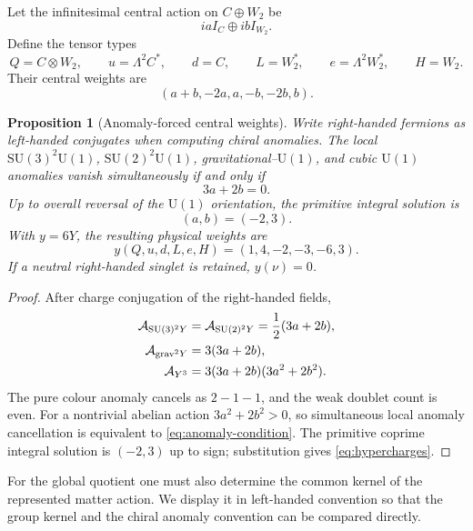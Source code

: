 \documentclass[11pt]{article}
\numberwithin{equation}{section}
\newtheorem{proposition}[theorem]{Proposition}
\theoremstyle{definition}
\theoremstyle{remark}
\newcommand{\U}{\mathrm U}
\newcommand{\SU}{\mathrm{SU}}
\begin{document}
Let the infinitesimal central action on $C\oplus W_2$ be
\[
iaI_C\oplus ibI_{W_2}.
\]
Define the tensor types
\begin{equation}
Q=C\otimes W_2,\qquad
u=\Lambda^2C^*,\qquad
d=C,\qquad
L=W_2^*,\qquad
e=\Lambda^2W_2^*,\qquad
H=W_2.
\label{eq:SM-types}
\end{equation}
Their central weights are
\begin{equation}
(a+b,-2a,a,-b,-2b,b).
\label{eq:central-weights}
\end{equation}

\begin{proposition}[Anomaly-forced central weights]
\label{thm:hypercharge}
Write right-handed fermions as left-handed conjugates when computing chiral
anomalies.  The local
$\SU(3)^2\U(1)$,
$\SU(2)^2\U(1)$,
gravitational--$\U(1)$,
and cubic $\U(1)$ anomalies vanish simultaneously if and only if
\begin{equation}
3a+2b=0.
\label{eq:anomaly-condition}
\end{equation}
Up to overall reversal of the $\U(1)$ orientation, the primitive integral
solution is
\[
(a,b)=(-2,3).
\]
With $y=6Y$, the resulting physical weights are
\begin{equation}
y(Q,u,d,L,e,H)=(1,4,-2,-3,-6,3).
\label{eq:hypercharges}
\end{equation}
If a neutral right-handed singlet is retained, $y(\nu)=0$.
\end{proposition}

\begin{proof}
After charge conjugation of the right-handed fields,
\begin{align*}
\mathcal A_{\SU(3)^2Y}
&=
\mathcal A_{\SU(2)^2Y}
=
\frac12(3a+2b),\\
\mathcal A_{{\rm grav}^2Y}
&=
3(3a+2b),\\
\mathcal A_{Y^3}
&=
3(3a+2b)(3a^2+2b^2).
\end{align*}
The pure colour anomaly cancels as $2-1-1$, and the weak doublet count is even.
For a nontrivial abelian action $3a^2+2b^2>0$, so simultaneous local anomaly
cancellation is equivalent to \eqref{eq:anomaly-condition}.  The primitive
coprime integral solution is $(-2,3)$ up to sign; substitution gives
\eqref{eq:hypercharges}.
\end{proof}

For the global quotient one must also determine the common kernel of the
represented matter action.  We display it in left-handed convention so
that the group kernel and the chiral anomaly convention can be compared
directly.
\end{document}
